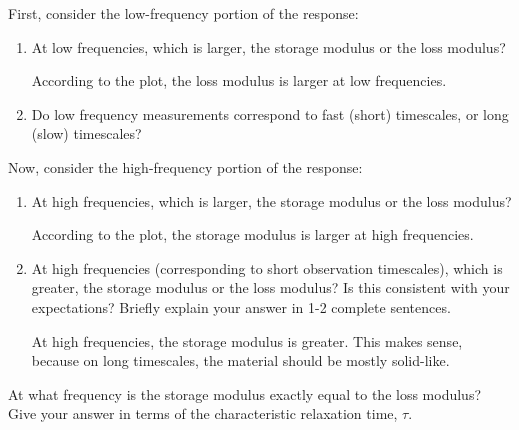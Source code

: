 \begin{activity}
\begin{ctqs}
	
	\question First, consider the low-frequency portion of the response:
	
		\begin{enumerate}
		
			\item  At low frequencies, which is larger, the storage modulus or the loss modulus?
	
					\begin{solution}[0.5in]
					
						According to the plot, the loss modulus is larger at low frequencies.
					
					\end{solution}
					
			\item Do low frequency measurements correspond to fast (short) timescales, or long (slow) timescales?
	
		\end{enumerate}
	
	\question Now, consider the high-frequency portion of the response:
	
		\begin{enumerate}
		
			\item At high frequencies, which is larger, the storage modulus or the loss modulus?
	
					\begin{solution}[0.5in]
					
						According to the plot, the storage modulus is larger at high frequencies.
					
					\end{solution}
		
			\item At high frequencies (corresponding to short observation timescales), which is greater, the storage modulus or the loss modulus?  Is this consistent with your expectations?  Briefly explain your answer in 1-2 complete sentences.
	
					\begin{solution}[1.1in]
					
						At high frequencies, the storage modulus is greater.  This makes sense, because on long timescales, the material should be mostly solid-like.
					\end{solution}
	\end{enumerate}

	\question At what frequency is the storage modulus exactly equal to the loss modulus?  Give your answer in terms of the characteristic relaxation time, $\tau$.
	

\end{ctqs}
\end{activity}
